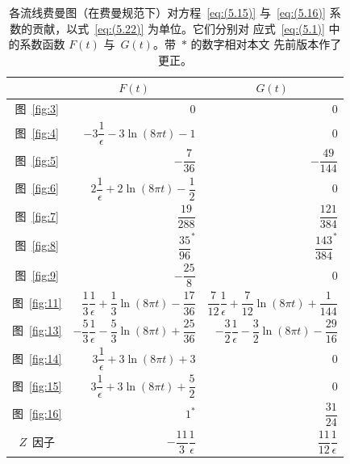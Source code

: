\begin{table}
\caption{各流线费曼图（在费曼规范下）对方程~\eqref{eq:(5.15)}
与~\eqref{eq:(5.16)} 系数的贡献，以式~\eqref{eq:(5.22)} 为单位。它们分别对
应式~\eqref{eq:(5.1)} 中的系数函数 $F(t)$ 与~$G(t)$。带~$*$ 的数字相对本文
先前版本作了更正。
}
\label{table:1}
\begin{center}
\renewcommand{\arraystretch}{2.2}
\setlength{\tabcolsep}{12pt}
\begin{tabular}{crr}
\toprule
 & \multicolumn{1}{c}{$F(t)$}
 & \multicolumn{1}{c}{$G(t)$} \\
\midrule
图~\ref{fig:3}  & $0$ & $0$ \\
图~\ref{fig:4}  & $-3\dfrac{1}{\epsilon}-3\ln(8\pi t)-1$ & $0$ \\
图~\ref{fig:5}  & $-\dfrac{7}{36}$ & $-\dfrac{49}{144}$ \\
图~\ref{fig:6}  & $2\dfrac{1}{\epsilon}+2\ln(8\pi t)-\dfrac{1}{2}$ & $0$ \\
图~\ref{fig:7}  & $\dfrac{19}{288}$ & $\dfrac{121}{384}$ \\
图~\ref{fig:8}  & $\dfrac{35}{96}^*$ & $\dfrac{143}{384}^*$ \\
图~\ref{fig:9}  & $-\dfrac{25}{8}$ & $0$\\
图~\ref{fig:11}  & $\dfrac{1}{3}\dfrac{1}{\epsilon}+\dfrac{1}{3}\ln(8\pi t)-\dfrac{17}{36}$ & $\dfrac{7}{12}\dfrac{1}{\epsilon}+\dfrac{7}{12}\ln(8\pi t)+\dfrac{1}{144}$\\
图~\ref{fig:13}  & $-\dfrac{5}{3}\dfrac{1}{\epsilon}-\dfrac{5}{3}\ln(8\pi t)+\dfrac{25}{36}$ & $-\dfrac{3}{2}\dfrac{1}{\epsilon}-\dfrac{3}{2}\ln(8\pi t)-\dfrac{29}{16}$\\
图~\ref{fig:14} & $3\dfrac{1}{\epsilon}+3\ln(8\pi t)+3$ & $0$ \\
图~\ref{fig:15}  & $3\dfrac{1}{\epsilon}+3\ln(8\pi t)+\dfrac{5}{2}$ & $0$ \\
图~\ref{fig:16}  & $1^*$ & $\dfrac{31}{24}$ \\
$Z$~因子 & $-\dfrac{11}{3}\dfrac{1}{\epsilon}$ & $\dfrac{11}{12}\dfrac{1}{\epsilon}$ \\
\bottomrule
\end{tabular}
\end{center}
\end{table}

